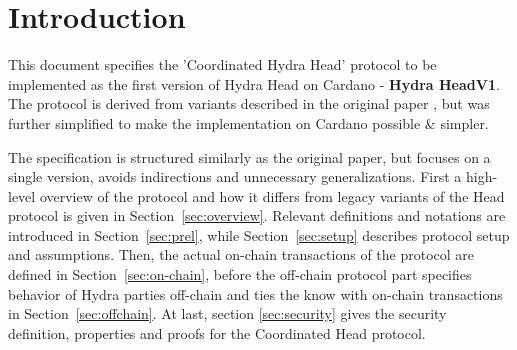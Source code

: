 \section{Introduction}
This document specifies the 'Coordinated Hydra Head' protocol to be implemented as the first version of Hydra Head on Cardano - \textbf{Hydra HeadV1}. The protocol is derived from variants described in the original paper \cite{hydrahead20}, but was further simplified to make the implementation on Cardano possible \& simpler.

The specification is structured similarly as the original paper, but focuses on a single version, avoids indirections and unnecessary generalizations. First a high-level overview of the protocol and how it differs from legacy variants of the Head protocol is given in Section~\ref{sec:overview}. Relevant definitions and notations are introduced in Section~\ref{sec:prel}, while Section~\ref{sec:setup} describes protocol setup and assumptions. Then, the actual on-chain transactions of the protocol are defined in Section~\ref{sec:on-chain}, before the off-chain protocol part specifies behavior of Hydra parties off-chain and ties the know with on-chain transactions in Section~\ref{sec:offchain}. At last, section \ref{sec:security} gives the security definition, properties and proofs for the Coordinated Head protocol. 

